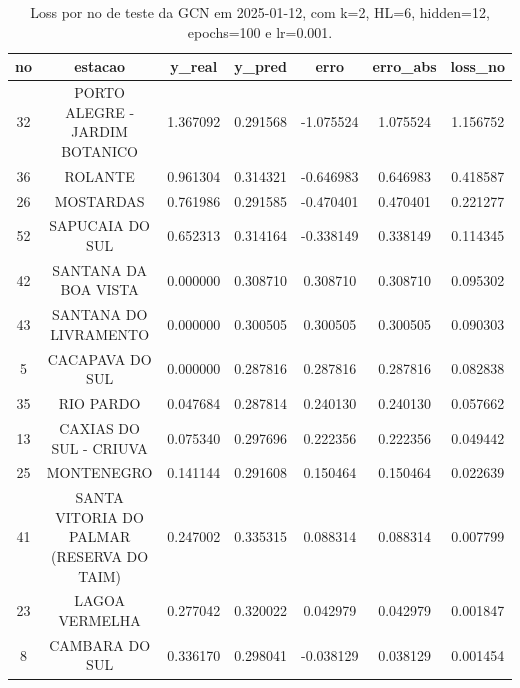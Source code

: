 \begin{table}[h]
\centering
\caption{Loss por no de teste da GCN em 2025-01-12, com k=2, HL=6, hidden=12, epochs=100 e lr=0.001.}
\label{tab:gcn_loss_k2_hl6_h12_e100_d20250112}
\begin{tabular}{ccccccc}
\toprule
no & estacao & y\_real & y\_pred & erro & erro\_abs & loss\_no \\
\midrule
32 & PORTO ALEGRE - JARDIM BOTANICO & 1.367092 & 0.291568 & -1.075524 & 1.075524 & 1.156752 \\
36 & ROLANTE & 0.961304 & 0.314321 & -0.646983 & 0.646983 & 0.418587 \\
26 & MOSTARDAS & 0.761986 & 0.291585 & -0.470401 & 0.470401 & 0.221277 \\
52 & SAPUCAIA DO SUL & 0.652313 & 0.314164 & -0.338149 & 0.338149 & 0.114345 \\
42 & SANTANA DA BOA VISTA & 0.000000 & 0.308710 & 0.308710 & 0.308710 & 0.095302 \\
43 & SANTANA DO LIVRAMENTO & 0.000000 & 0.300505 & 0.300505 & 0.300505 & 0.090303 \\
5 & CACAPAVA DO SUL & 0.000000 & 0.287816 & 0.287816 & 0.287816 & 0.082838 \\
35 & RIO PARDO & 0.047684 & 0.287814 & 0.240130 & 0.240130 & 0.057662 \\
13 & CAXIAS DO SUL - CRIUVA & 0.075340 & 0.297696 & 0.222356 & 0.222356 & 0.049442 \\
25 & MONTENEGRO & 0.141144 & 0.291608 & 0.150464 & 0.150464 & 0.022639 \\
41 & SANTA VITORIA DO PALMAR (RESERVA DO TAIM) & 0.247002 & 0.335315 & 0.088314 & 0.088314 & 0.007799 \\
23 & LAGOA VERMELHA & 0.277042 & 0.320022 & 0.042979 & 0.042979 & 0.001847 \\
8 & CAMBARA DO SUL & 0.336170 & 0.298041 & -0.038129 & 0.038129 & 0.001454 \\
\bottomrule
\end{tabular}
\end{table}
